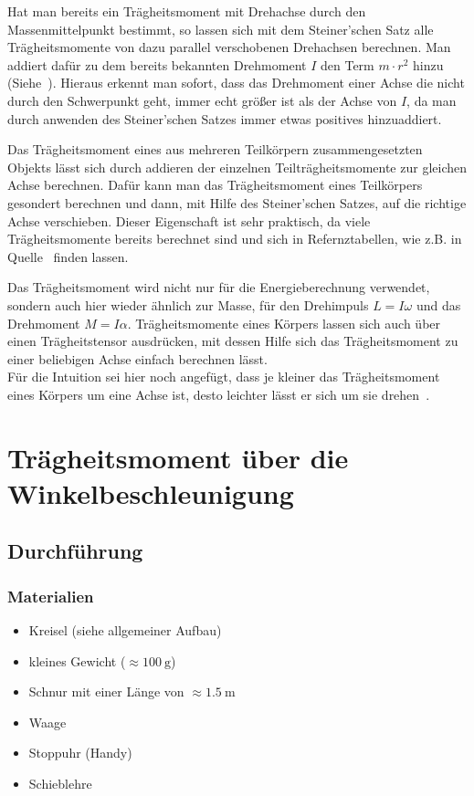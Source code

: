 \documentclass{article}
\begin{document}
	Hat man bereits ein Trägheitsmoment mit Drehachse durch den Massenmittelpunkt bestimmt, so lassen sich mit dem Steiner'schen Satz alle Trägheitsmomente von dazu parallel verschobenen Drehachsen berechnen.
	Man addiert dafür zu dem bereits bekannten Drehmoment \(I\) den Term \(m \cdot r^2\) hinzu (Siehe~\cite{Steiner}). Hieraus erkennt man sofort, dass das Drehmoment einer Achse die nicht
	durch den Schwerpunkt geht, immer echt größer ist als der Achse von \(I\),
	da man durch anwenden des Steiner'schen Satzes immer etwas positives hinzuaddiert.
	
	Das Trägheitsmoment eines aus mehreren Teilkörpern zusammengesetzten Objekts lässt sich durch addieren der einzelnen Teilträgheitsmomente zur gleichen Achse berechnen.
	Dafür kann man das Trägheitsmoment eines Teilkörpers gesondert berechnen und dann, mit Hilfe des Steiner'schen Satzes, auf die richtige Achse verschieben.
	Dieser Eigenschaft ist sehr praktisch, da viele Trägheitsmomente bereits berechnet sind und sich in Refernztabellen, wie z.B. in Quelle~\cite{HallidayPhysik} finden lassen.
	
	Das Trägheitsmoment wird nicht nur für die Energieberechnung verwendet, sondern auch hier wieder ähnlich zur Masse, für den Drehimpuls \(L = I \omega \) und das Drehmoment \(M = I \alpha \).
	Trägheitsmomente eines Körpers lassen sich auch über einen Trägheitstensor ausdrücken, mit dessen Hilfe sich das Trägheitsmoment zu einer beliebigen Achse einfach berechnen lässt. \\
	Für die Intuition sei hier noch angefügt, dass je kleiner das Trägheitsmoment eines Körpers um eine Achse ist, desto leichter lässt er sich um sie drehen~\cite{HallidayPhysik}.

	\section{Trägheitsmoment über die Winkelbeschleunigung}

	\subsection{Durchführung}
	\subsubsection{Materialien}
	\begin{itemize}
		\item Kreisel (siehe allgemeiner Aufbau)
		\item kleines Gewicht (\(\approx \SI{100}{\gram}\))
		\item Schnur mit einer Länge von \(\approx \SI{1,5}{\metre} \)
		\item Waage
		\item Stoppuhr (Handy)
		\item Schieblehre
	\end{itemize}
\end{document}
